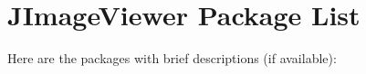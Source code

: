 \section{JImage\-Viewer Package List}
Here are the packages with brief descriptions (if available):\begin{CompactList}
\item{}
\end{CompactList}
